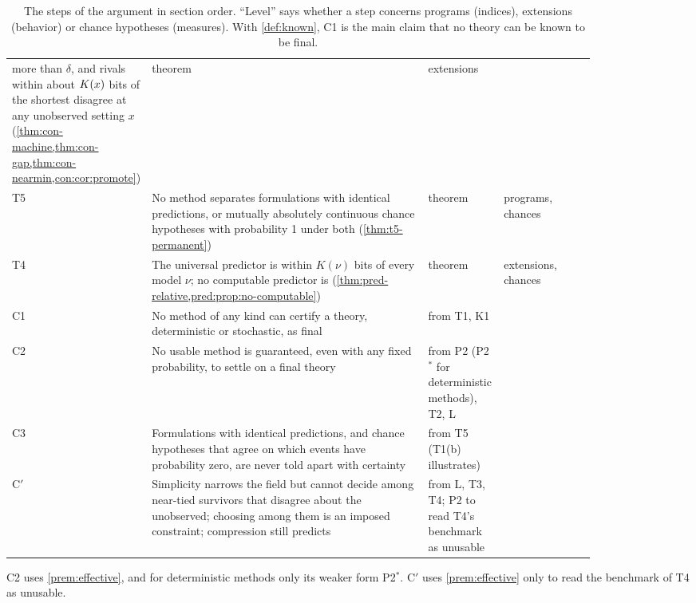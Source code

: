 \begin{table}[!htbp]
\begin{tabular}{@{}l>{\raggedright\arraybackslash}p{0.55\linewidth}%
>{\raggedright\arraybackslash}p{0.13\linewidth}%
>{\raggedright\arraybackslash}p{0.17\linewidth}@{}}
  more than $\delta$, and rivals within about $K(x)$ bits of the shortest disagree at
  any unobserved setting $x$
  (\cref{thm:con-machine,thm:con-gap,thm:con-nearmin,con:cor:promote}) & theorem & extensions \\
T5 & No method separates formulations with identical predictions, or mutually
  absolutely continuous chance hypotheses with probability 1 under both (\cref{thm:t5-permanent}) & theorem &
  programs, chances \\
T4 & The universal predictor is within $K(\nu)$ bits of every model $\nu$; no
  computable predictor is (\cref{thm:pred-relative,pred:prop:no-computable}) &
  theorem & extensions, chances \\
\midrule
C1 & No method of any kind can certify a theory, deterministic or stochastic, as final
  & from T1, K1 & \\
C2 & No usable method is guaranteed, even with any fixed probability, to settle on a
  final theory & from P2 (P2$^{*}$ for deterministic methods), T2, L & \\
C3 & Formulations with identical predictions, and chance hypotheses that agree on
  which events have probability zero, are never told apart with certainty & from T5
  (T1(b) illustrates) & \\
C$'$ & Simplicity narrows the field but cannot decide among near-tied survivors that
  disagree about the unobserved; choosing among them is an imposed constraint;
  compression still predicts & from L, T3, T4; P2 to read T4's benchmark as unusable & \\
\bottomrule
\end{tabular}
\caption{The steps of the argument in section order. ``Level'' says whether a step
concerns programs (indices), extensions (behavior) or chance hypotheses (measures).
With \cref{def:known}, C1 is the main claim that no theory can be known to be final.}
\label{tab:outline}
\end{table}

\noindent C2 uses \cref{prem:effective}, and for deterministic methods only its weaker form
P2$^{*}$. C$'$ uses \cref{prem:effective} only to read the benchmark of T4 as unusable.
